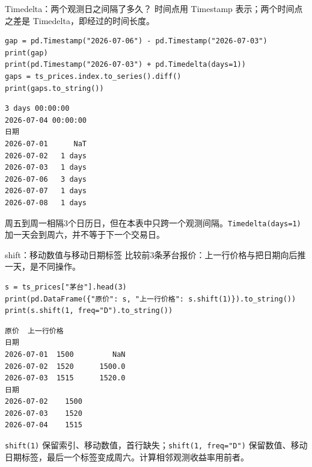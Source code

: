 \documentclass[9pt]{ctexbeamer}
\begin{document}
\begin{frame}[fragile]{Timedelta：两个观测日之间隔了多久？}
\small 时间点用 Timestamp 表示；两个时间点之差是 Timedelta，即经过的时间长度。
\medskip
\begin{lstlisting}
gap = pd.Timestamp("2026-07-06") - pd.Timestamp("2026-07-03")
print(gap)
print(pd.Timestamp("2026-07-03") + pd.Timedelta(days=1))
gaps = ts_prices.index.to_series().diff()
print(gaps.to_string())
\end{lstlisting}
\begin{lstlisting}[language={},numbers=none,basicstyle=\ttfamily\scriptsize]
3 days 00:00:00
2026-07-04 00:00:00
日期
2026-07-01      NaT
2026-07-02   1 days
2026-07-03   1 days
2026-07-06   3 days
2026-07-07   1 days
2026-07-08   1 days
\end{lstlisting}
\small 周五到周一相隔3个日历日，但在本表中只跨一个观测间隔。\texttt{Timedelta(days=1)} 加一天会到周六，并不等于下一个交易日。
\end{frame}

\begin{frame}[fragile]{shift：移动数值与移动日期标签}
\small 比较前3条茅台报价：上一行价格与把日期向后推一天，是不同操作。
\medskip
\begin{lstlisting}
s = ts_prices["茅台"].head(3)
print(pd.DataFrame({"原价": s, "上一行价格": s.shift(1)}).to_string())
print(s.shift(1, freq="D").to_string())
\end{lstlisting}
\begin{lstlisting}[language={},numbers=none,basicstyle=\ttfamily\scriptsize]
            原价  上一行价格
日期
2026-07-01  1500         NaN
2026-07-02  1520      1500.0
2026-07-03  1515      1520.0
日期
2026-07-02    1500
2026-07-03    1520
2026-07-04    1515
\end{lstlisting}
\small \texttt{shift(1)} 保留索引、移动数值，首行缺失；\texttt{shift(1, freq="D")} 保留数值、移动日期标签，最后一个标签变成周六。计算相邻观测收益率用前者。
\end{frame}
\end{document}
